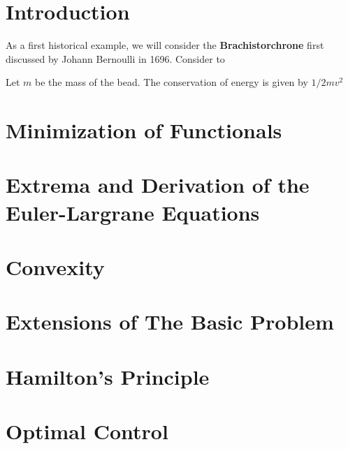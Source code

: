 \documentclass{article}
\theoremstyle{plain}
\theoremstyle{definition}
\theoremstyle{remark}
\begin{document}
\titlePage

\tableOfContents

\disclaimer

\section{Introduction}

As a first historical example, we will consider the \textbf{Brachistorchrone} first discussed by Johann Bernoulli in 1696. Consider to

\begin{center}
\end{center}


Let $m$ be the mass of the bead. The conservation of energy is given by $1/2 m v^2$


\section{Minimization of Functionals}

\section{Extrema and Derivation of the Euler-Largrane Equations}

\section{Convexity}

\section{Extensions of The Basic Problem}

\section{Hamilton's Principle}

\section{Optimal Control}
\end{document}
